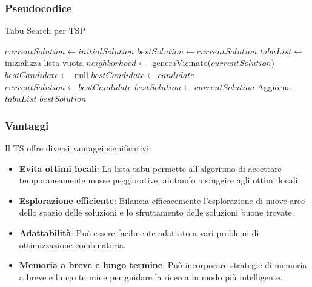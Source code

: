 \subsubsection{Pseudocodice}


\begin{algorithm}
	\caption{Tabu Search per \gls{TSP}}\label{alg:tabusearch}
	\begin{algorithmic}[1]
		\State $currentSolution \gets initialSolution$
		\State $bestSolution \gets currentSolution$
		\State $tabuList \gets$ inizializza lista vuota
		\State $neighborhood \gets$ generaVicinato($currentSolution$)
		\State $bestCandidate \gets$ null
		\State $bestCandidate \gets candidate$
		\EndIf
		\EndFor
		\State $currentSolution \gets bestCandidate$
		\State $bestSolution \gets currentSolution$
		\EndIf
		\State Aggiorna $tabuList$
		\EndFor
		\State \Return $bestSolution$
		\EndProcedure
	\end{algorithmic}
\end{algorithm}

\subsubsection{Vantaggi}

Il \gls{TS} offre diversi vantaggi significativi:

\begin{itemize}
	\item \textbf{Evita ottimi locali}: La lista tabu permette all'algoritmo di accettare temporaneamente mosse peggiorative, aiutando a sfuggire agli ottimi locali.
	\item \textbf{Esplorazione efficiente}: Bilancia efficacemente l'esplorazione di nuove aree dello spazio delle soluzioni e lo sfruttamento delle soluzioni buone trovate.
	\item \textbf{Adattabilità}: Può essere facilmente adattato a vari problemi di ottimizzazione combinatoria.
	\item \textbf{Memoria a breve e lungo termine}: Può incorporare strategie di memoria a breve e lungo termine per guidare la ricerca in modo più intelligente.
\end{itemize}

